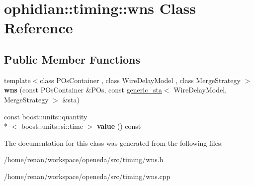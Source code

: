 \hypertarget{classophidian_1_1timing_1_1wns}{\section{ophidian\-:\-:timing\-:\-:wns Class Reference}
\label{classophidian_1_1timing_1_1wns}
}
\subsection*{Public Member Functions}
\begin{DoxyCompactItemize}
\item 
\hypertarget{classophidian_1_1timing_1_1wns_ab74cdcdfb966818119ba6ed8579eb9ed}{{\footnotesize template$<$class P\-Os\-Container , class Wire\-Delay\-Model , class Merge\-Strategy $>$ }\\{\bfseries wns} (const P\-Os\-Container \&P\-Os, const \hyperlink{classophidian_1_1timing_1_1generic__sta}{generic\-\_\-sta}$<$ Wire\-Delay\-Model, Merge\-Strategy $>$ \&sta)}\label{classophidian_1_1timing_1_1wns_ab74cdcdfb966818119ba6ed8579eb9ed}

\item 
\hypertarget{classophidian_1_1timing_1_1wns_a87065c5167909c9f9d7c954e3ab4be9b}{const boost\-::units\-::quantity\\*
$<$ boost\-::units\-::si\-::time $>$ {\bfseries value} () const }\label{classophidian_1_1timing_1_1wns_a87065c5167909c9f9d7c954e3ab4be9b}

\end{DoxyCompactItemize}


The documentation for this class was generated from the following files\-:\begin{DoxyCompactItemize}
\item 
/home/renan/workspace/openeda/src/timing/wns.\-h\item 
/home/renan/workspace/openeda/src/timing/wns.\-cpp\end{DoxyCompactItemize}
